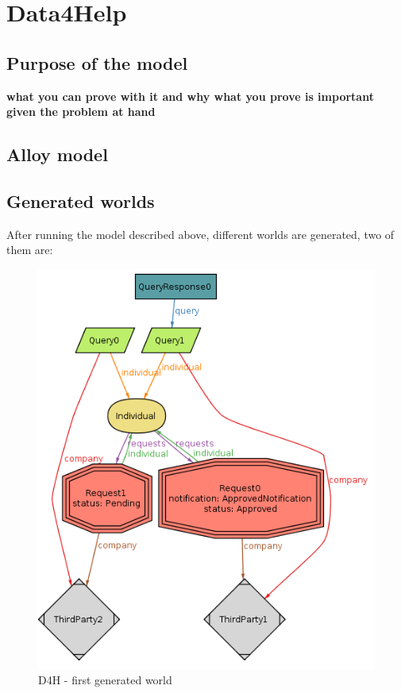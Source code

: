 \documentclass[a4paper, hidelinks, 12pt]{report}
\begin{document}
	\section{Data4Help}
	\subsection{Purpose of the model}
	\textbf{what you can prove with it and why what you prove is important given the problem at hand}
	
	\subsection{Alloy model}
	\vspace{2 mm}
	
	
	
	\vspace{8 mm}
	
	\subsection{Generated worlds}
	After running the model described above, different worlds are generated, two of them are:
	
	\begin{figure}[H]
		\centering
		\includegraphics[scale=0.55]{Diagrams/goal_2_world_1.png}
		\caption[D4H - first generated world]{D4H - first generated world}
		\label{fig:goal_2_world_1}
	\end{figure}
	
\end{document}
